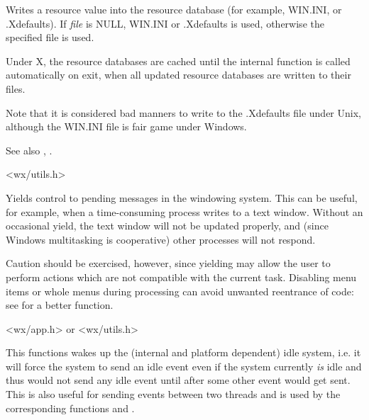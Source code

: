 
Writes a resource value into the resource database (for example, WIN.INI, or
.Xdefaults). If {\it file} is NULL, WIN.INI or .Xdefaults is used,
otherwise the specified file is used.

Under X, the resource databases are cached until the internal function
 is called automatically on exit, when
all updated resource databases are written to their files.

Note that it is considered bad manners to write to the .Xdefaults
file under Unix, although the WIN.INI file is fair game under Windows.

See also , .


<wx/utils.h>

\label{wxyield}


Yields control to pending messages in the windowing system. This can be useful, for example, when a
time-consuming process writes to a text window. Without an occasional
yield, the text window will not be updated properly, and (since Windows
multitasking is cooperative) other processes will not respond.

Caution should be exercised, however, since yielding may allow the
user to perform actions which are not compatible with the current task.
Disabling menu items or whole menus during processing can avoid unwanted
reentrance of code: see  for a better
function.


<wx/app.h> or <wx/utils.h>

\label{wxwakeupidle}


This functions wakes up the (internal and platform dependent) idle system, i.e. it
will force the system to send an idle event even if the system currently {\it is}
idle and thus would not send any idle event until after some other event would get
sent. This is also useful for sending events between two threads and is used by
the corresponding functions  and 
.

